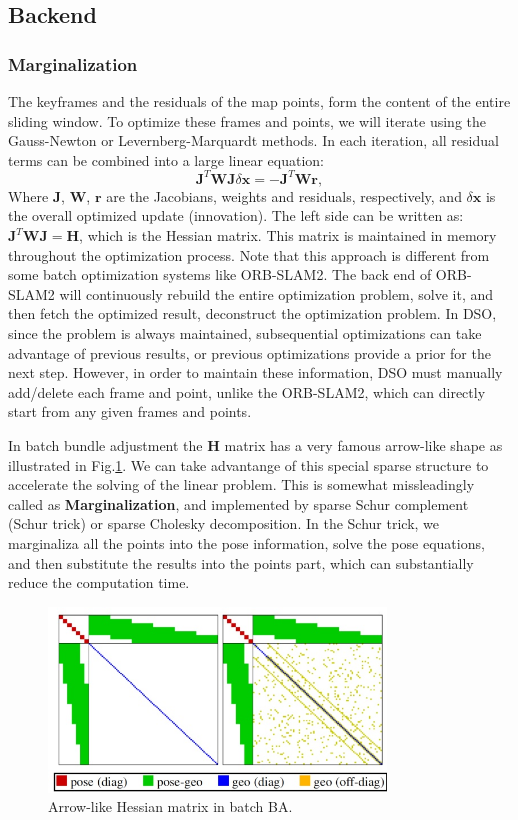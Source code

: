 \documentclass[a4paper,10pt]{article}
\begin{document}
	\subsection{Backend}
	\subsubsection{Marginalization}
	The keyframes and the residuals of the map points, form the content of the entire sliding window. To optimize these frames and points, we will iterate using the Gauss-Newton or Levernberg-Marquardt methods. In each iteration, all residual terms can be combined into a large linear equation:
	\begin{equation}
	\mathbf{J}^T \mathbf{W} \mathbf{J} \delta \mathbf{x}=-\mathbf{J}^T \mathbf{W} \mathbf{r},
	\end{equation}
	Where $\mathbf{J}$, $\mathbf{W}$, $\mathbf{r}$ are the Jacobians, weights and residuals, respectively, and $\delta \mathbf{x}$ is the overall optimized update (innovation). The left side can be written as: $\mathbf{J}^T \mathbf{WJ}=\mathbf{H}$, which is the Hessian matrix. This matrix is maintained in memory throughout the optimization process. Note that this approach is different from some batch optimization systems like ORB-SLAM2. The back end of ORB-SLAM2 will continuously rebuild the entire optimization problem, solve it, and then fetch the optimized result, deconstruct the optimization problem. In DSO, since the problem is always maintained, subsequential optimizations can take advantage of previous results, or previous optimizations provide a prior for the next step. However, in order to maintain these information, DSO must manually add/delete each frame and point, unlike the ORB-SLAM2, which can directly start from any given frames and points.
	
	In batch bundle adjustment the $\mathbf{H}$ matrix has a very famous arrow-like shape as illustrated in Fig.\ref{fig:H-dso}. We can take advantange of this special sparse structure to accelerate the solving of the linear problem. This is somewhat missleadingly called as \textbf{Marginalization}, and implemented by sparse Schur complement (Schur trick) or sparse Cholesky decomposition. In the Schur trick, we marginaliza all the points into the pose information, solve the pose equations, and then substitute the results into the points part, which can substantially reduce the computation time. 
	
	\begin{figure}[!thp]
		\centering
		\includegraphics[width=0.8\textwidth]{figs/H.jpg}
		\caption{Arrow-like Hessian matrix in batch BA.}
		\label{fig:H-dso}
	\end{figure}
		
\end{document}
